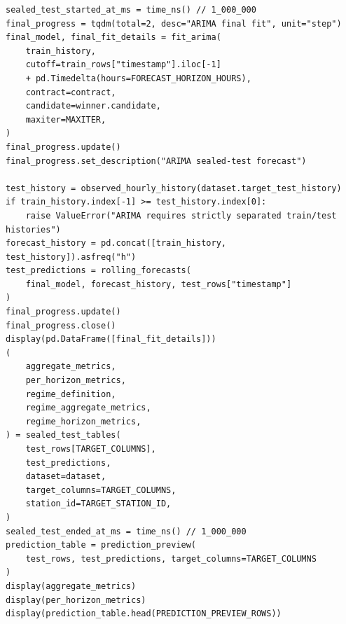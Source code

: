 \begin{verbatim}
sealed_test_started_at_ms = time_ns() // 1_000_000
final_progress = tqdm(total=2, desc="ARIMA final fit", unit="step")
final_model, final_fit_details = fit_arima(
    train_history,
    cutoff=train_rows["timestamp"].iloc[-1]
    + pd.Timedelta(hours=FORECAST_HORIZON_HOURS),
    contract=contract,
    candidate=winner.candidate,
    maxiter=MAXITER,
)
final_progress.update()
final_progress.set_description("ARIMA sealed-test forecast")

test_history = observed_hourly_history(dataset.target_test_history)
if train_history.index[-1] >= test_history.index[0]:
    raise ValueError("ARIMA requires strictly separated train/test histories")
forecast_history = pd.concat([train_history, test_history]).asfreq("h")
test_predictions = rolling_forecasts(
    final_model, forecast_history, test_rows["timestamp"]
)
final_progress.update()
final_progress.close()
display(pd.DataFrame([final_fit_details]))
(
    aggregate_metrics,
    per_horizon_metrics,
    regime_definition,
    regime_aggregate_metrics,
    regime_horizon_metrics,
) = sealed_test_tables(
    test_rows[TARGET_COLUMNS],
    test_predictions,
    dataset=dataset,
    target_columns=TARGET_COLUMNS,
    station_id=TARGET_STATION_ID,
)
sealed_test_ended_at_ms = time_ns() // 1_000_000
prediction_table = prediction_preview(
    test_rows, test_predictions, target_columns=TARGET_COLUMNS
)
display(aggregate_metrics)
display(per_horizon_metrics)
display(prediction_table.head(PREDICTION_PREVIEW_ROWS))
\end{verbatim}

